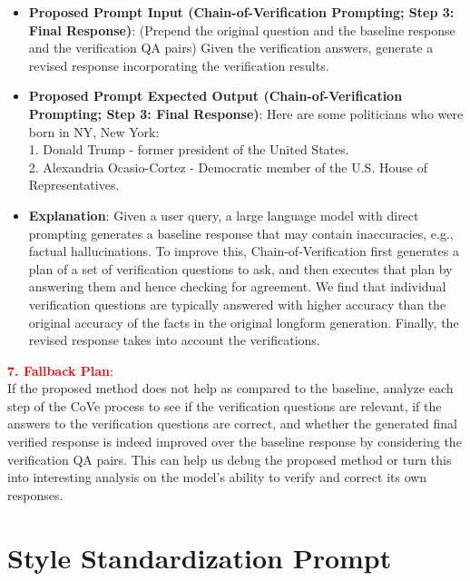 \begin{itemize}[topsep=0pt, itemsep=0pt]
    \item \textbf{Proposed Prompt Input (Chain-of-Verification Prompting; Step 3: Final Response)}: (Prepend the original question and the baseline response and the verification QA pairs) Given the verification answers, generate a revised response incorporating the verification results.
    \item \textbf{Proposed Prompt Expected Output (Chain-of-Verification Prompting; Step 3: Final Response)}: Here are some politicians who were born in NY, New York: \\
        1. Donald Trump - former president of the United States. \\
        2. Alexandria Ocasio-Cortez - Democratic member of the U.S. House of Representatives.
    \item \textbf{Explanation}: Given a user query, a large language model with direct prompting generates a baseline response that may contain inaccuracies, e.g., factual hallucinations. To improve this, Chain-of-Verification first generates a plan of a set of verification questions to ask, and then executes that plan by answering them and hence checking for agreement. We find that individual verification questions are typically answered with higher accuracy than the original accuracy of the facts in the original longform generation. Finally, the revised response takes into account the verifications.
\end{itemize} 

\textbf{\textcolor{red}{7. Fallback Plan}}: \\
If the proposed method does not help as compared to the baseline, analyze each step of the CoVe process to see if the verification questions are relevant, if the answers to the verification questions are correct, and whether the generated final verified response is indeed improved over the baseline response by considering the verification QA pairs. This can help us debug the proposed method or turn this into interesting analysis on the model's ability to verify and correct its own responses.




\newpage









\section{Style Standardization Prompt}
\label{sec:style_transfer_prompt}


